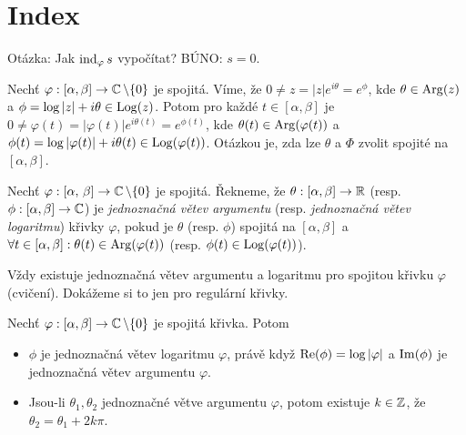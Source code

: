 \section{Index}

\begin{note}
Otázka: Jak $\operatorname{ind}_\varphi s$ vypočítat? BÚNO: $s=0$.
\end{note}

\begin{notation}
Nechť $\varphi: [\alpha, \beta] \rightarrow \operatorname{\mathbb{C}}  \setminus \{0\}$ je spojitá. Víme, že $0 \neq z = |z|e^{i \theta}=e^{\phi}$, kde $\theta \in \operatorname*{Arg}(z)$ a $\phi = \log|z| + i \theta \in \operatorname*{Log}(z)$. Potom pro každé $t \in [\alpha, \beta]$ je $ 0 \neq \varphi(t)=|\varphi(t)|e^{i \theta(t)}=e^{ \phi(t)}$, kde $\theta(t) \in \operatorname*{Arg}(\varphi(t))$ a $\phi(t)=\log|\varphi(t)|+i \theta(t) \in \operatorname*{Log}(\varphi(t))$. 
Otázkou je, zda lze $\theta$ a $\Phi$ zvolit spojité na $[\alpha,\beta]$.
\end{notation}

\begin{definition}
Nechť $\varphi: [\alpha,\,\beta] \rightarrow \operatorname{\mathbb{C}}  \setminus \{0\}$ je spojitá. Řekneme, že $\theta: [\alpha, \beta] \rightarrow \operatorname{\mathbb{R}}$ (resp. $\phi: [\alpha, \beta] \rightarrow \operatorname{\mathbb{C}} $) je \emph{jednoznačná větev argumentu} (resp. \emph{jednoznačná větev logaritmu}) křivky $\varphi$, pokud je $\theta$ (resp. $\phi$) spojitá na $[\alpha, \beta]$ a $\forall t \in [\alpha, \beta]:  \theta(t) \in \operatorname*{Arg}(\varphi(t))$ (resp. $\phi(t) \in \operatorname*{Log}(\varphi(t))$).
\end{definition}

\begin{note}
Vždy existuje jednoznačná větev argumentu a logaritmu pro spojitou křivku $\varphi$ (cvičení). Dokážeme si to jen pro regulární křivky.
\end{note}

\begin{theorem}
Nechť $\varphi: [\alpha, \beta] \rightarrow \operatorname{\mathbb{C}}  \setminus \{0\}$ je spojitá křivka. Potom
\begin{itemize}
    \item $\phi$ je jednoznačná větev logaritmu $\varphi$, právě když $\operatorname{Re}(\phi) = \log|\varphi|$ a $\operatorname{Im}(\phi)$ je jednoznačná větev argumentu $\varphi$.
    \item Jsou-li $\theta_1, \theta_2$ jednoznačné větve argumentu $\varphi$, potom existuje $k \in \operatorname{\mathbb{Z}}$, že $\theta_2=\theta_1 + 2 k \pi $.
\end{itemize}
\end{theorem}

